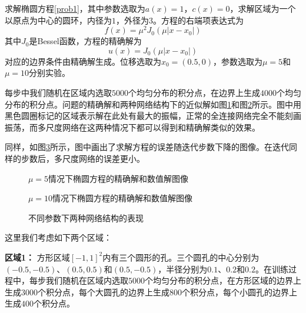求解椭圆方程\ref{prob1}，其中参数选取为$a(x)=1$，$c(x)=0$，求解区域为一个以原点为中心的圆环，内径为$1$，外径为$3$。方程的右端项表达式为
\begin{equation}
f(x) = \mu^2 J_0(\mu |x - x_0|)
\end{equation}
其中$J_0$是Bessel函数，方程的精确解为
\begin{equation}
u(x) = J_0(\mu |x - x_0|)
\end{equation}
对应的边界条件由精确解生成。位移选取为$x_0 = (0.5, 0)$，参数选取为$\mu=5$和$\mu=10$分别实验。

每步中我们随机在区域内选取$5000$个均匀分布的积分点，在边界上生成$4000$个均匀分布的积分点。问题的精确解和两种网络结构下的近似解如图\ref{func4-m5}和图\ref{func4-m10}所示。图中用黑色圆圈标记的区域表示解在此处有最大的振幅，正常的全连接网络完全不能刻画振荡，而多尺度网络在这两种情况下都可以得到和精确解类似的效果。

同样，如图\ref{e6}所示，图中画出了求解方程的误差随迭代步数下降的图像。在迭代同样的步数后，多尺度网络的误差更小。

\begin{figure}[htbp]
\centering
{}
\caption{$\mu=5$情况下椭圆方程的精确解和数值解图像}
\label{func4-m5}
\end{figure}

\begin{figure}[htbp]
\centering
{}
\caption{$\mu=10$情况下椭圆方程的精确解和数值解图像}
\label{func4-m10}
\end{figure}

\begin{figure}[htbp]
\centering
{}
\caption{不同参数下两种网络结构的表现}
\label{e6}
\end{figure}


这里我们考虑如下两个区域：

{\bf 区域1：} 方形区域$[-1, 1]^2$内有三个圆形的孔。三个圆孔的中心分别为$(-0.5,-0.5)$、$(0.5,0.5)$和$(0.5,-0.5)$，半径分别为$0.1$、$0.2$和$0.2$。在训练过程中，每步我们随机在区域内选取$5000$个均匀分布的积分点，在方形区域的边界上生成$3000$个积分点，每个大圆孔的边界上生成$800$个积分点，每个小圆孔的边界上生成$400$个积分点。

